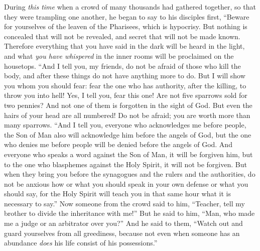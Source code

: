 \begin{biblechapter} %
 During \textit{this time} when a crowd of many thousands had gathered together, so that they were trampling one another, he began to say to his disciples first, “Beware for yourselves of the leaven of the Pharisees, which is hypocrisy.
\verse But nothing is concealed that will not be revealed, and secret that will not be made known.
\verse Therefore everything that you have said in the dark will be heard in the light, and what \textit{you have whispered} in the inner rooms will be proclaimed on the housetops.
 “And I tell you, my friends, do not be afraid of those who kill the body, and after these things do not have anything more to do.
\verse But I will show you whom you should fear: fear the one who has authority, after the killing, to throw you into hell! Yes, I tell you, fear this one!
\verse Are not five sparrows sold for two pennies? And not one of them is forgotten in the sight of God.
\verse But even the hairs of your head are all numbered! Do not be afraid; you are worth more than many sparrows.
 “And I tell you, everyone who acknowledges me before people, the Son of Man also will acknowledge him before the angels of God,
\verse but the one who denies me before people will be denied before the angels of God.
\verse And everyone who speaks a word against the Son of Man, it will be forgiven him, but to the one who blasphemes against the Holy Spirit, it will not be forgiven.
\verse But when they bring you before the synagogues and the rulers and the authorities, do not be anxious how or what you should speak in your own defense or what you should say,
\verse for the Holy Spirit will teach you in that same hour what it is necessary to say.”
 Now someone from the crowd said to him, “Teacher, tell my brother to divide the inheritance with me!”
\verse But he said to him, “Man, who made me a judge or an arbitrator over you?”
\verse And he said to them, “Watch out and guard yourselves from all greediness, because not even when someone has an abundance \textit{does} his life consist of his possessions.”

\end{biblechapter}
